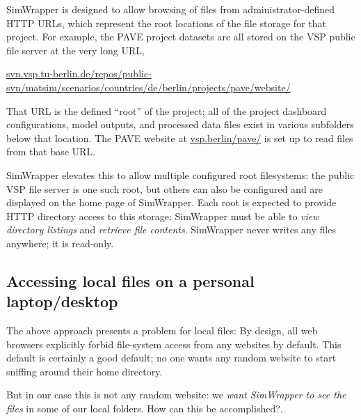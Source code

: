 SimWrapper is designed to allow browsing of files from administrator-defined HTTP URLs, which represent the root locations of the file storage for that project. For example, the PAVE project datasets are all stored on the VSP public file server at the very long URL,

\href{https://svn.vsp.tu-berlin.de/repos/public-svn/matsim/scenarios/countries/de/berlin/projects/pave/website/}{svn.vsp.tu-berlin.de/repos/public-svn/matsim/scenarios/countries/de/berlin/projects/pave/website/}

That URL is the defined ``root'' of the project; all of the project dashboard configurations, model outputs, and processed data files exist in various subfolders below that location. The PAVE website at \href{https://vsp.berlin/pave/}{vsp.berlin/pave/} is set up to read files from that base URL. %

SimWrapper elevates this to allow multiple configured root filesystems: the public VSP file server is one such root, but others can also be configured and are displayed on the home page of SimWrapper. Each root is expected to provide HTTP directory access to this storage: SimWrapper must be able to \emph{view directory listings} and \emph{retrieve file contents}. SimWrapper never writes any files anywhere; it is read-only.


\hypertarget{simwrapper-local-files-on-a-personal-laptopdesktop}{%
\subsection{Accessing local files on a personal laptop/desktop}\label{local-files-on-a-personal-laptopdesktop}}

The above approach presents a problem for local files: By design, all web browsers explicitly forbid file-system access from any websites by default. This default is certainly a good default; no one wants any random website to start sniffing around their home directory.

But in our case this is not any random website: we \emph{want SimWrapper to see the files} in some of our local folders. How can this be accomplished?.

